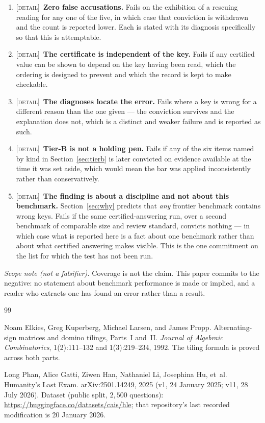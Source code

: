 \documentclass[11pt,a4paper]{article}
\theoremstyle{remark}
\begin{document}
\begin{enumerate}[leftmargin=*]
\item \textsc{[detail]}~\textbf{Zero false accusations.} Fails on the exhibition of a rescuing reading
for any one of the five, in which case that conviction is withdrawn and the count is reported lower.
Each is stated with its diagnosis specifically so that this is attemptable.
\item \textsc{[detail]}~\textbf{The certificate is independent of the key.} Fails if any certified
value can be shown to depend on the key having been read, which the ordering is designed to prevent
and which the record is kept to make checkable.
\item \textsc{[detail]}~\textbf{The diagnoses locate the error.} Fails where a key is wrong for a
different reason than the one given --- the conviction survives and the explanation does not, which is
a distinct and weaker failure and is reported as such.
\item \textsc{[detail]}~\textbf{Tier-B is not a holding pen.} Fails if any of the six items named by
kind in Section~\ref{sec:tierb} is later convicted on evidence available at the time it was set aside,
which would mean the bar was applied inconsistently rather than conservatively.
\item \textsc{[detail]}~\textbf{The finding is about a discipline and not about this benchmark.}
Section~\ref{sec:why} predicts that \emph{any} frontier benchmark contains wrong keys. Fails if the
same certified-answering run, over a second benchmark of comparable size and review standard, convicts
nothing --- in which case what is reported here is a fact about one benchmark rather than about what
certified answering makes visible. This is the one commitment on the list for which the test has not
been run.
\end{enumerate}

\noindent\emph{Scope note (not a falsifier).} Coverage is not the claim. This paper commits to the
negative: no statement about benchmark performance is made or implied, and a reader who extracts one
has found an error rather than a result.

\begin{thebibliography}{99}

Noam Elkies, Greg Kuperberg, Michael Larsen, and James Propp.
\newblock Alternating-sign matrices and domino tilings, Parts~I and~II.
\newblock \emph{Journal of Algebraic Combinatorics}, 1(2):111--132 and 1(3):219--234, 1992.
\newblock The tiling formula is proved across both parts.

Long Phan, Alice Gatti, Ziwen Han, Nathaniel Li, Josephina Hu, et~al.
\newblock Humanity's Last Exam.
\newblock arXiv:2501.14249, 2025 (v1, 24 January 2025; v11, 28 July 2026).
\newblock Dataset (public split, $2{,}500$ questions):
\url{https://huggingface.co/datasets/cais/hle}; that repository's last recorded modification is
20 January 2026.

\end{thebibliography}
\end{document}
